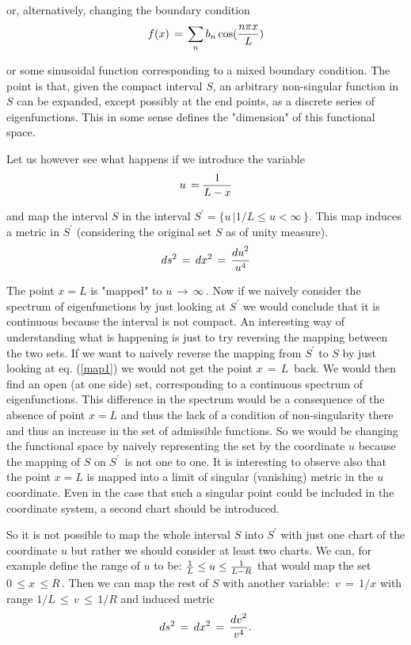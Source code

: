 \documentclass[a4paper,12pt]{article}
\begin{document}
\noindent or, alternatively, changing the boundary condition
\begin{equation}
f(x)\,=\,\sum_n  b_n \cos ({n\pi x\over L}) 
\end{equation}

\noindent or some sinusoidal function corresponding to a mixed 
boundary condition. The point is that, given the compact interval $S$,
an arbitrary non-singular function  in $S$ can be expanded, 
except possibly at the
end points, as a discrete series of eigenfunctions.
This in some sense defines the "dimension" of this functional space.
 

Let us however see what happens if we  introduce the variable 
\begin{equation}
\label{map1}
u \,= {1\over L - x }
\end{equation}

\noindent and map the interval $S$ in the interval 
$S^\prime = \{ u\, \vert 1/L \le u < \infty\,\}$. This map induces a 
metric in $S^\prime$ (considering the original set $S$ as of unity 
measure).
\begin{equation}
\label{metric1}
ds^2 \,=\, dx^2\,=\,{{du}^2\over u^4}
\end{equation}

\noindent 
The point $x = L$ is "mapped" to $u \,\rightarrow \,\infty\,$.
Now if we naively consider the spectrum of eigenfunctions 
by just looking at $S^\prime$ we would
conclude that it is continuous because the interval is not compact.
An interesting way of understanding what is happening is just to try 
reversing the mapping between the two sets.  
If we want to  naively reverse the mapping from $S^\prime$ to $S$
by just looking at eq. (\ref{map1}) we would not get the point 
$x\,=\,L\,$ back.
We would then  find an open (at one side) set, corresponding to a 
continuous spectrum of eigenfunctions. This difference in the 
spectrum would be a 
consequence of the absence of point $x = L $ and thus the lack of 
a condition of non-singularity there and thus an increase in the
set of admissible functions. So we would be changing the 
functional space by naively representing the set by the 
coordinate $u$ because the mapping of 
$S$ on $S^\prime\,$ is not one to one. 
It is interesting to observe also that the point $x = L $ is mapped
into a limit of singular (vanishing) metric in the $u$ coordinate.
Even in the case that such a singular point could be included in the 
coordinate system, a second chart should be introduced\cite{HE}.

So it is not possible to map the whole interval $S$ into $S^\prime$ with 
just one chart of the coordinate $u$  but rather we should consider
at least two charts.
We can, for example define the range of $u$ to be:
$ {1\over L} \le u \le {1\over L - R}$ that would map 
the set $0\,\le x \,\le R\,$. Then we can map the rest of
$S$ with another variable: $\,v\,=\,1/x$ with range 
$ 1/L \,\le\, v\, \le\, 1/R $ and induced metric 
\begin{equation}
ds^2 \,=\, dx^2 \,=\, {{dv}^2\over v^4}.
\end{equation}
\end{document}
